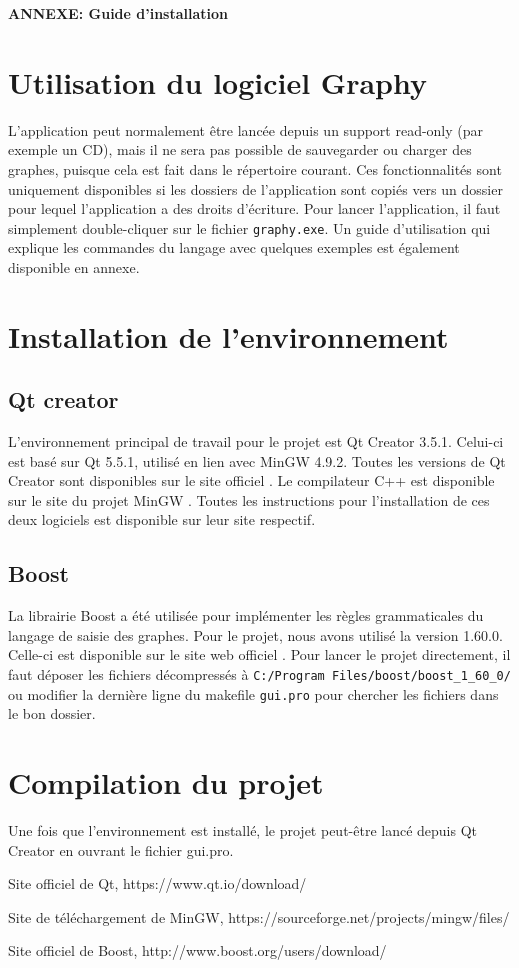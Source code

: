 \documentclass[french]{article}
\begin{document}
	\centering
	\large{\textbf{ANNEXE: Guide d'installation}}
	
	\justifying
	\normalsize
	
	\section{Utilisation du logiciel Graphy}
	L'application peut normalement être lancée depuis un support read-only (par exemple un CD), mais il ne sera pas possible de sauvegarder ou charger des graphes, puisque cela est fait dans le répertoire courant. Ces fonctionnalités sont uniquement disponibles si les dossiers de l'application sont copiés vers un dossier pour lequel l'application a des droits d'écriture. Pour lancer l'application, il faut simplement double-cliquer sur le fichier \texttt{graphy.exe}. Un guide d'utilisation qui explique les commandes du langage avec quelques exemples est également disponible en annexe.
	
	\section{Installation de l'environnement}
		\subsection{Qt creator}
		L'environnement principal de travail pour le projet est Qt Creator 3.5.1. Celui-ci est basé sur Qt 5.5.1, utilisé en lien avec MinGW 4.9.2. Toutes les versions de Qt Creator sont disponibles sur le site officiel \cite{qt}. Le compilateur C++ est disponible sur le site du projet MinGW \cite{minGW}. Toutes les instructions pour l'installation de ces deux logiciels est disponible sur leur site respectif.
	
		\subsection{Boost}
		La librairie Boost a été utilisée pour implémenter les règles grammaticales du langage de saisie des graphes. Pour le projet, nous avons utilisé la version 1.60.0. Celle-ci est disponible sur le site web officiel \cite{boost}. Pour lancer le projet directement, il faut déposer les fichiers décompressés à \texttt{C:/Program Files/boost/boost_1_60_0/} ou modifier la dernière ligne du makefile \texttt{gui.pro} pour chercher les fichiers dans le bon dossier.
	
	\section{Compilation du projet}
	Une fois que l'environnement est installé, le projet peut-être lancé depuis Qt Creator en ouvrant le fichier gui.pro.
	
	\begin{thebibliography}{9}
		Site officiel de Qt, https://www.qt.io/download/
		
		Site de téléchargement de MinGW, https://sourceforge.net/projects/mingw/files/
		
		Site officiel de Boost, http://www.boost.org/users/download/
	\end{thebibliography}
	
\end{document}
